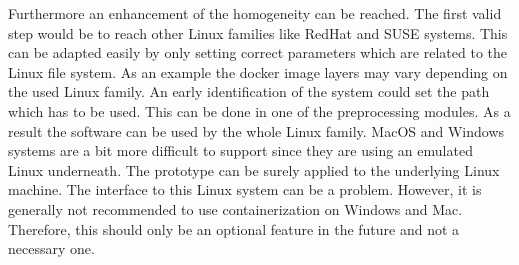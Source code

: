 Furthermore an enhancement of the homogeneity can be reached. The first valid step would be to reach other Linux families like RedHat and SUSE systems. This can be adapted easily by only setting correct parameters which are related to the Linux file system. As an example the docker image layers may vary depending on the used Linux family. An early identification of the system could set the path which has to be used. This can be done in one of the preprocessing modules. As a result the software can be used by the whole Linux family. MacOS and Windows systems are a bit more difficult to support since they are using an emulated Linux underneath. The prototype can be surely applied to the underlying Linux machine. The interface to this Linux system can be a problem. However, it is generally not recommended to use containerization on Windows and Mac. Therefore, this should only be an optional feature in the future and not a necessary one.



